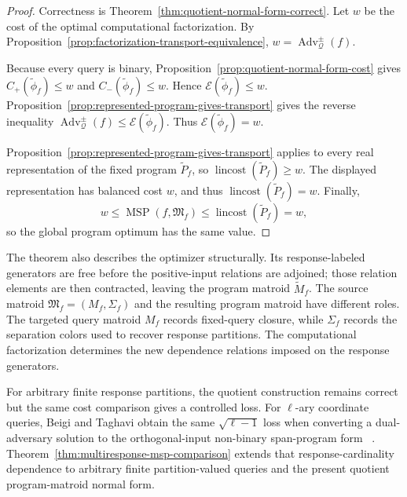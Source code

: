 \documentclass[11pt]{article}
\numberwithin{equation}{section}
\theoremstyle{remark}
\begin{document}
\begin{proof}
Correctness is Theorem~\ref{thm:quotient-normal-form-correct}. Let
$w$ be the cost of the optimal computational factorization. By
Proposition~\ref{prop:factorization-transport-equivalence},
$w=\operatorname{Adv}^{\pm}_{\mathcal Q}(f)$.

Because every query is binary,
Proposition~\ref{prop:quotient-normal-form-cost} gives
$C_+(\widetilde\phi_f)\leq w$ and
$C_-(\widetilde\phi_f)\leq w$. Hence
$\mathcal E(\widetilde\phi_f)\leq w$.
Proposition~\ref{prop:represented-program-gives-transport} gives the reverse
inequality
$\operatorname{Adv}^{\pm}_{\mathcal Q}(f)
\leq\mathcal E(\widetilde\phi_f)$.
Thus $\mathcal E(\widetilde\phi_f)=w$.

Proposition~\ref{prop:represented-program-gives-transport} applies to every
real representation of the fixed program $\widetilde P_f$, so
$\operatorname{lincost}(\widetilde P_f)\geq w$. The displayed representation
has balanced cost $w$, and thus
$\operatorname{lincost}(\widetilde P_f)=w$. Finally,
\begin{equation}
    w
    \leq
    \operatorname{MSP}(f,\mathfrak M_f)
    \leq
    \operatorname{lincost}(\widetilde P_f)
    =
    w,
\end{equation}
so the global program optimum has the same value.
\end{proof}

The theorem also describes the optimizer structurally. Its response-labeled
generators are free before the positive-input relations are adjoined; those
relation elements are then contracted, leaving the program matroid
$\widetilde M_f$. The source matroid $\mathfrak M_f=(M_f,\Sigma_f)$ and
the resulting program matroid have different roles. The targeted query
matroid $M_f$ records fixed-query closure, while $\Sigma_f$ records the
separation colors used to recover response partitions. The computational
factorization determines the new dependence relations imposed on the response
generators.

For arbitrary finite response partitions, the quotient construction remains
correct but the same cost comparison gives a controlled loss. For
$\ell$-ary coordinate queries, Beigi and Taghavi obtain the same
$\sqrt{\ell-1}$ loss when converting a dual-adversary solution to the
orthogonal-input non-binary span-program form
~\cite{BeigiTaghavi2019}. Theorem~\ref{thm:multiresponse-msp-comparison}
extends that response-cardinality dependence to arbitrary finite
partition-valued queries and the present quotient program-matroid normal
form.
\end{document}
